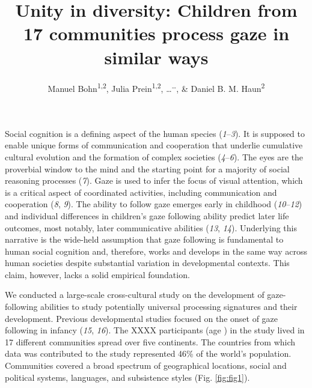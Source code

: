 \documentclass[
  man,floatsintext]{apa6}
\title{Unity in diversity: Children from 17 communities process gaze in similar ways}
\author{Manuel Bohn\textsuperscript{1,2}, Julia Prein\textsuperscript{1,2}, \ldots{}\textsuperscript{\ldots{}}, \& Daniel B. M. Haun\textsuperscript{2}}
\date{}
\affiliation{\vspace{0.5cm}\textsuperscript{1} Institute of Psychology in Education, Leuphana University Lüneburg\\\textsuperscript{2} Department of Comparative Cultural Psychology, Max Planck Institute for Evolutionary Anthropology}
\begin{document}
\maketitle

Social cognition is a defining aspect of the human species (\emph{1}--\emph{3}). It is supposed to enable unique forms of communication and cooperation that underlie cumulative cultural evolution and the formation of complex societies (\emph{4}--\emph{6}). The eyes are the proverbial window to the mind and the starting point for a majority of social reasoning processes (\emph{7}). Gaze is used to infer the focus of visual attention, which is a critical aspect of coordinated activities, including communication and cooperation (\emph{8}, \emph{9}). The ability to follow gaze emerges early in childhood (\emph{10}--\emph{12}) and individual differences in children's gaze following ability predict later life outcomes, most notably, later communicative abilities (\emph{13}, \emph{14}). Underlying this narrative is the wide-held assumption that gaze following is fundamental to human social cognition and, therefore, works and develops in the same way across human societies despite substantial variation in developmental contexts. This claim, however, lacks a solid empirical foundation.

We conducted a large-scale cross-cultural study on the development of gaze-following abilities to study potentially universal processing signatures and their development. Previous developmental studies focused on the onset of gaze following in infancy (\emph{15}, \emph{16}). The XXXX participants (age ) in the study lived in 17 different communities spread over five continents. The countries from which data was contributed to the study represented 46\% of the world's population. Communities covered a broad spectrum of geographical locations, social and political systems, languages, and subsistence styles (Fig. \ref{fig:fig1}).
\end{document}
